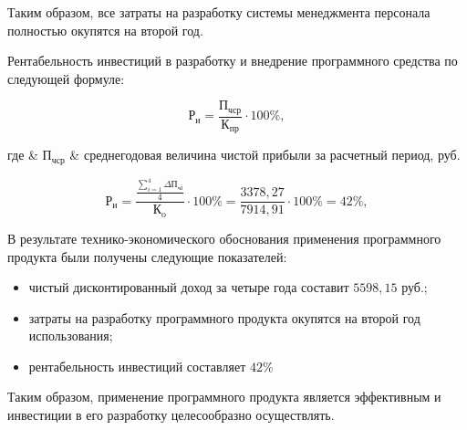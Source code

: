 Таким образом, все затраты на разработку системы менеджмента персонала полностью окупятся на второй год.

Рентабельность инвестиций в разработку и внедрение программного средства по следующей формуле:

\begin{equation}
  \text{Р}_\text{и} = \frac{\text{П}_\text{чср}}{\text{К}_\text{пр}} \cdot 100\%,
\end{equation}
\begin{explanation}
  где & $ \text{П}_\text{чср} $ & среднегодовая величина чистой прибыли за расчетный период, руб.
\end{explanation}

\begin{equation}
  \text{Р}_\text{и} = \frac{\frac{\sum_{i=1}^{4} \Delta\text{П}_\text{чi}}{4}}{\text{К}_\text{o}} \cdot 100\% = \frac{3378,27}{7914,91} \cdot 100\% = 42\%,
\end{equation}

В результате технико-экономического обоснования применения программного продукта были получены следующие показателей:
\begin{itemize}
	\item чистый дисконтированный доход за четыре года составит $5598,15$ руб.;
	\item затраты на разработку программного продукта окупятся на второй год использования;
	\item рентабельность инвестиций составляет $42\%$
\end{itemize}

Таким образом, применение программного продукта является эффективным и инвестиции в его разработку целесообразно
осуществлять.

